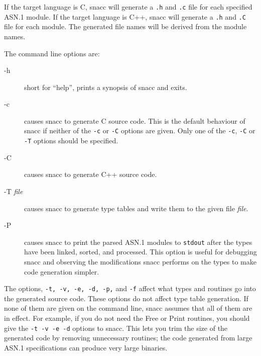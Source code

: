 If the target language is C, snacc will generate a \verb$.h$ and
\verb$.c$ file for each specified ASN.1 module.  If the target
language is C++, snacc will generate a \verb$.h$ and \verb$.C$ file
for each module.  The generated file names will be derived from the
module names.

The command line options are:

\begin{description}
\item[-h    ] {short for ``help'', prints a synopsis of snacc
and exits.}

\item[-c    ] {causes snacc to generate C source code.
This is the default behaviour of snacc if neither of the \verb$-c$ or
\verb$-C$ options are given.  Only one of the \verb$-c$, \verb$-C$ or
\verb$-T$ options should be specified.}

\item[-C    ] {causes snacc to generate C++ source code.}

\item[-T {\em file}] {causes snacc to generate type tables and
write them to the given file {\em file}.}

\item[-P    ] {causes snacc to print the parsed ASN.1
modules to \verb$stdout$ after the types have been linked, sorted, and
processed.  This option is useful for debugging snacc and observing
the modifications snacc performs on the types to make code generation
simpler.}
\end{description}

The options, \verb$-t, -v, -e, -d, -p,$ and \verb$-f$ affect
what types and routines go into the generated source code.
These options do not affect type table generation. If none of
them are given on the command line, snacc assumes that all of them are
in effect.  For example, if you do not need the Free or Print
routines, you should give the \verb$-t -v -e -d$ options to snacc.
This lets you trim the size of the generated code by removing
unnecessary routines; the code generated from large ASN.1
specifications can produce very large binaries.

